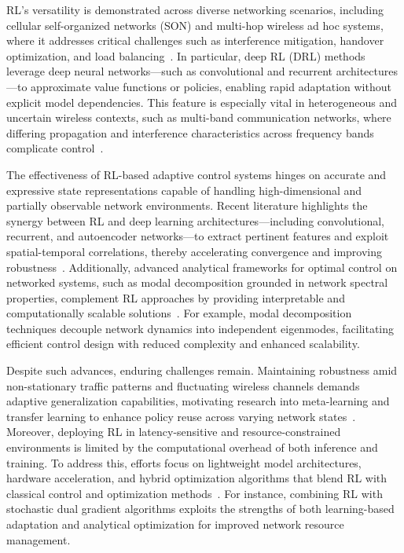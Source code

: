 \documentclass[sigconf]{acmart}
\begin{document}
RL's versatility is demonstrated across diverse networking scenarios, including cellular self-organized networks (SON) and multi-hop wireless ad hoc systems, where it addresses critical challenges such as interference mitigation, handover optimization, and load balancing~\cite{ref31,ref32,ref33,ref34,ref35}. In particular, deep RL (DRL) methods leverage deep neural networks—such as convolutional and recurrent architectures—to approximate value functions or policies, enabling rapid adaptation without explicit model dependencies. This feature is especially vital in heterogeneous and uncertain wireless contexts, such as multi-band communication networks, where differing propagation and interference characteristics across frequency bands complicate control~\cite{ref12}.

The effectiveness of RL-based adaptive control systems hinges on accurate and expressive state representations capable of handling high-dimensional and partially observable network environments. Recent literature highlights the synergy between RL and deep learning architectures—including convolutional, recurrent, and autoencoder networks—to extract pertinent features and exploit spatial-temporal correlations, thereby accelerating convergence and improving robustness~\cite{ref31,ref2,ref50}. Additionally, advanced analytical frameworks for optimal control on networked systems, such as modal decomposition grounded in network spectral properties, complement RL approaches by providing interpretable and computationally scalable solutions~\cite{ref32,ref34}. For example, modal decomposition techniques decouple network dynamics into independent eigenmodes, facilitating efficient control design with reduced complexity and enhanced scalability.

Despite such advances, enduring challenges remain. Maintaining robustness amid non-stationary traffic patterns and fluctuating wireless channels demands adaptive generalization capabilities, motivating research into meta-learning and transfer learning to enhance policy reuse across varying network states~\cite{ref35}. Moreover, deploying RL in latency-sensitive and resource-constrained environments is limited by the computational overhead of both inference and training. To address this, efforts focus on lightweight model architectures, hardware acceleration, and hybrid optimization algorithms that blend RL with classical control and optimization methods~\cite{ref5,ref33}. For instance, combining RL with stochastic dual gradient algorithms exploits the strengths of both learning-based adaptation and analytical optimization for improved network resource management.
\end{document}
